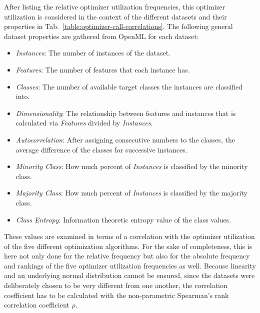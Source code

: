 After listing the relative optimizer utilization frequencies, this optimizer utilization is considered in the context of the different datasets and their properties in Tab.~\ref{table:optimizer-call-correlations}.
The following general dataset properties are gathered from OpenML for each dataset:
\begin{itemize}
    \item \textit{Instances}: The number of instances of the dataset.
    \item \textit{Features}: The number of features that each instance has.
    \item \textit{Classes}: The number of available target classes the instances are classified into.
    \item \textit{Dimensionality}: The relationship between features and instances that is calculated via \textit{Features} divided by \textit{Instances}.
    \item \textit{Autocorrelation}: After assigning consecutive numbers to the classes, the average difference of the classes for successive instances.
    \item \textit{Minority Class}: How much percent of \textit{Instances} is classified by the minority class.
    \item \textit{Majority Class}: How much percent of \textit{Instances} is classified by the majority class.
    \item \textit{Class Entropy}: Information theoretic entropy value of the class values.
\end{itemize}
These values are examined in terms of a correlation with the optimizer utilization of the five different optimization algorithms.
For the sake of completeness, this is here not only done for the relative frequency but also for the absolute frequency and rankings of the five optimizer utilization frequencies as well.\newline
Because linearity and an underlying normal distribution cannot be ensured, since the datasets were deliberately chosen to be very different from one another, the correlation coefficient has to be calculated with the non-parametric Spearman's rank correlation coefficient $\rho$.

